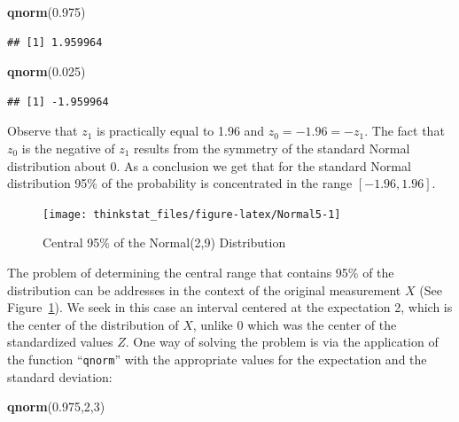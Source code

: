 \documentclass[]{krantz}
\makeatletter
\newenvironment{Shaded}{\begin{snugshade}}{\end{snugshade}}
\newcommand{\KeywordTok}[1]{\textcolor[rgb]{0.13,0.29,0.53}{\textbf{#1}}}
\newcommand{\DecValTok}[1]{\textcolor[rgb]{0.00,0.00,0.81}{#1}}
\newcommand{\FloatTok}[1]{\textcolor[rgb]{0.00,0.00,0.81}{#1}}
\newcommand{\NormalTok}[1]{#1}
\newenvironment{kframe}{%
\medskip{}
\setlength{\fboxsep}{.8em}
 \def\at@end@of@kframe{}%
 \ifinner\ifhmode%
  \def\at@end@of@kframe{\end{minipage}}%
  \begin{minipage}{\columnwidth}%
 \fi\fi%
 \def\FrameCommand##1{\hskip\@totalleftmargin \hskip-\fboxsep
 \colorbox{shadecolor}{##1}\hskip-\fboxsep
     \hskip-\linewidth \hskip-\@totalleftmargin \hskip\columnwidth}%
 \MakeFramed {\advance\hsize-\width
   \@totalleftmargin\z@ \linewidth\hsize
   \@setminipage}}%
 {\par\unskip\endMakeFramed%
 \at@end@of@kframe}
\renewenvironment{Shaded}{\begin{kframe}}{\end{kframe}}
\theoremstyle{definition}
\theoremstyle{definition}
\theoremstyle{definition}
\theoremstyle{remark}
\makeatother
\begin{document}
\begin{Shaded}
\begin{Highlighting}[]
\KeywordTok{qnorm}\NormalTok{(}\FloatTok{0.975}\NormalTok{)}
\end{Highlighting}
\end{Shaded}

\begin{verbatim}
## [1] 1.959964
\end{verbatim}

\begin{Shaded}
\begin{Highlighting}[]
\KeywordTok{qnorm}\NormalTok{(}\FloatTok{0.025}\NormalTok{)}
\end{Highlighting}
\end{Shaded}

\begin{verbatim}
## [1] -1.959964
\end{verbatim}

Observe that \(z_1\) is practically equal to 1.96 and
\(z_0 = -1.96 = -z_1\). The fact that \(z_0\) is the negative of \(z_1\)
results from the symmetry of the standard Normal distribution about 0.
As a conclusion we get that for the standard Normal distribution 95\% of
the probability is concentrated in the range \([-1.96, 1.96]\).

\begin{figure}

{\centering \texttt{[image: thinkstat\_files/figure-latex/Normal5-1]} 

}

\caption{Central 95$\%$ of the Normal(2,9) Distribution}\label{fig:Normal5}
\end{figure}

The problem of determining the central range that contains 95\% of the
distribution can be addresses in the context of the original measurement
\(X\) (See Figure~\ref{fig:Normal5}). We seek in this case an interval
centered at the expectation 2, which is the center of the distribution
of \(X\), unlike 0 which was the center of the standardized values
\(Z\). One way of solving the problem is via the application of the
function ``\texttt{qnorm}'' with the appropriate values for the
expectation and the standard deviation:

\begin{Shaded}
\begin{Highlighting}[]
\KeywordTok{qnorm}\NormalTok{(}\FloatTok{0.975}\NormalTok{,}\DecValTok{2}\NormalTok{,}\DecValTok{3}\NormalTok{)}
\end{Highlighting}
\end{Shaded}
\end{document}
